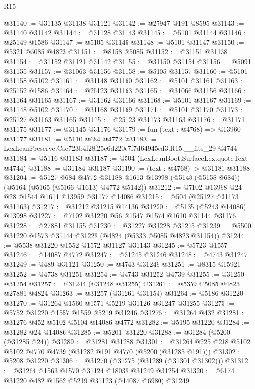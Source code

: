 \begin{lexlean}{R15}
\begin{coremodule}
{{{{{{{{{{{@31140 := @31135 @31138 @31121
@31142 := @27947 @191 @8595
@31143 := @31140 @31142
@31144 := @31128 @31143
@31145 := @5101 @31144
@31146 := @25149 @1586
@31147 := @5105 @31146
@31148 := @5101 @31147
@31150 := @5321 @5085 @4823
@31151 := @8158 @5085
@31152 := @31151 @31138
@31154 := @31152 @31121 @31142
@31155 := @31150 @31154
@31156 := @5091 @31155
@31157 := @31063 @31156
@31158 := @5105 @31157
@31160 := @5101 @31158 @5102
@31161 := @31148 @31160
@31162 := @5101 @31161
@31163 := @25152 @1586
@31164 := @25123 @31163
@31165 := @31066 @31156
@31166 := @31164 @31165
@31167 := @31162 @31166
@31168 := @5101 @31167
@31169 := @31148 @5102
@31170 := @31168 @31169
@31171 := @5101 @31170
@31173 := @25127 @31163 @31165
@31175 := @25123 @31173 @31163
@31176 := @31171 @31175
@31177 := @31145 @31176
@31179 := fun (text : @4768) => @13960 @31177
@31181 := @5110 @684 @4772
@31183 := LexLeanPreserve.Cae723b4f28f25c6d220e7f7d64945ed3.R15.__fits_29 @4744
@31184 := @5116 @31183
@31187 := @504 (LexLeanBoot.SurfaceLex.quoteText @4744)
@31188 := @31184 @31187
@31190 := (text : @4768) -> @31181 @31188
@31204 := @5127
    @684
    @4772
    @31188
    @1613
    @13998
    (@5148 (@5158 @684))
    (@5164 (@5165 (@5166 @1613) @4772 @5142))
@31212 := @7102 @13998 @24 @28 @1544 @1611 @13959 @31177 @14086
@31215 := @504 (@25127 @31173 @31163)
@31217 := @31212 @31215 @14136
@31220 := @5135 (@5243 @14086) @13998
@31227 := @7102 @31220 @56 @1547 @1574 @1610 @31144 @31176
@31228 := @27881 @31155
@31230 := @31227 @31228 @31215
@31239 := @5500 @31220 @1573 @31144 @31228 (@4824 (@5333 @5085 @4823 @31154))
@31244 := @5538 @31220 @1552 @1572 @31127 @31143
@31245 := @5723 @1557
@31246 := @14087 @4772
@31247 := @31245 @31246
@31248 := @4743 @31247
@31249 := @489 @31121
@31250 := @4743 @31249
@31251 := @8315 @15921
@31252 := @4738 @31251
@31254 := @4743 @31252 @4739
@31255 := @31250 @31254
@31257 := @31244 (@31248 @31255)
@31261 := @5359 @5085 @4823 @27881 @4824
@31263 := @31257 (@31261 @31154)
@31264 := @5186 @31220
@31270 := @31264 @1560 @1571 @5219 @31126 @31247 @31255
@31275 := @5752 @31220 @1557 @1559 @5219 @31246
@31276 := @31264 @432
@31281 := @31276 @452 @5102 @5104 @14086 @4772
@31282 := @5195 @31220
@31284 := @31282 @24 @14086
@31285 := @5201 @31220
@31288 := @31284 (@5200 (@31285 @24))
@31289 := @31281 @31288
@31301 := @31264 @225 @218 @5102 @5102 @4770 @4739 (@31282 @191 @4770 (@5200 (@31285 @191)))
@31302 := @5208 @31220
@31306 := @31270 (@31275 (@31289 (@31301 @31302)))
@31312 := @31264 @1563 @1570 @31124 @18038 @31249 @31254
@31320 := @5174 @31220 @482 @1562 @5219 @31123 (@14087 @6980) @31249
}}}}}}}}}}}
\end{coremodule}
\end{lexlean}
